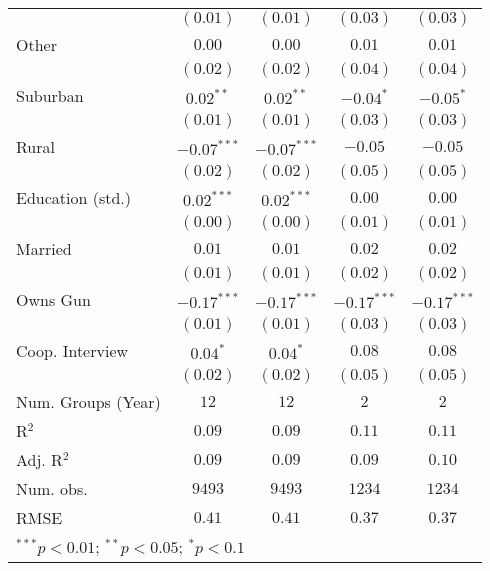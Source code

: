 \begin{table}
\begin{center}
\begin{tabular}{l c c c c}
                        & $(0.01)$      & $(0.01)$      & $(0.03)$      & $(0.03)$      \\
Other                   & $0.00$        & $0.00$        & $0.01$        & $0.01$        \\
                        & $(0.02)$      & $(0.02)$      & $(0.04)$      & $(0.04)$      \\
Suburban                & $0.02^{**}$   & $0.02^{**}$   & $-0.04^{*}$   & $-0.05^{*}$   \\
                        & $(0.01)$      & $(0.01)$      & $(0.03)$      & $(0.03)$      \\
Rural                   & $-0.07^{***}$ & $-0.07^{***}$ & $-0.05$       & $-0.05$       \\
                        & $(0.02)$      & $(0.02)$      & $(0.05)$      & $(0.05)$      \\
Education (std.)        & $0.02^{***}$  & $0.02^{***}$  & $0.00$        & $0.00$        \\
                        & $(0.00)$      & $(0.00)$      & $(0.01)$      & $(0.01)$      \\
Married                 & $0.01$        & $0.01$        & $0.02$        & $0.02$        \\
                        & $(0.01)$      & $(0.01)$      & $(0.02)$      & $(0.02)$      \\
Owns Gun                & $-0.17^{***}$ & $-0.17^{***}$ & $-0.17^{***}$ & $-0.17^{***}$ \\
                        & $(0.01)$      & $(0.01)$      & $(0.03)$      & $(0.03)$      \\
Coop. Interview         & $0.04^{*}$    & $0.04^{*}$    & $0.08$        & $0.08$        \\
                        & $(0.02)$      & $(0.02)$      & $(0.05)$      & $(0.05)$      \\
\midrule
Num. Groups (Year)      & $12$          & $12$          & $2$           & $2$           \\
R$^2$                   & $0.09$        & $0.09$        & $0.11$        & $0.11$        \\
Adj. R$^2$              & $0.09$        & $0.09$        & $0.09$        & $0.10$        \\
Num. obs.               & $9493$        & $9493$        & $1234$        & $1234$        \\
RMSE                    & $0.41$        & $0.41$        & $0.37$        & $0.37$        \\
\bottomrule
\multicolumn{5}{l}{\scriptsize{$^{***}p<0.01$; $^{**}p<0.05$; $^{*}p<0.1$}}
\end{tabular}
\label{table_school_alt_treat}
\end{center}
\end{table}
